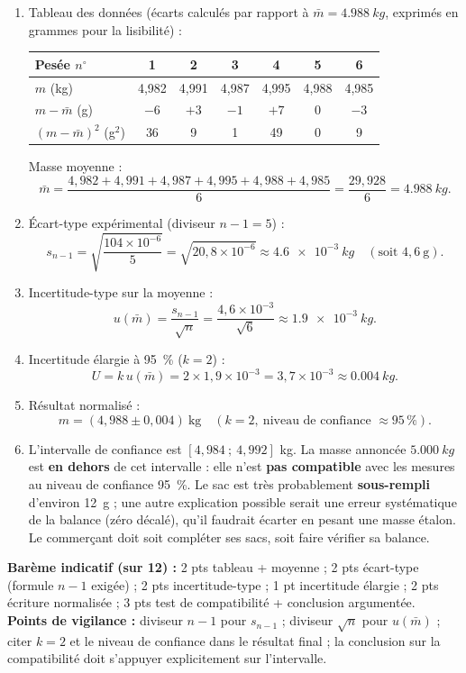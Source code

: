 \documentclass[11pt]{article}
\begin{document}
\begin{corrige}
\begin{enumerate}
\item Tableau des données (écarts calculés par rapport à $\bar{m} = \SI{4,988}{kg}$, exprimés en grammes pour la lisibilité) :
\begin{center}
\begin{tabular}{|l|*{6}{c|}}
\hline
Pesée $n^{\circ}$ & 1 & 2 & 3 & 4 & 5 & 6 \\
\hline
$m$ (kg) & 4,982 & 4,991 & 4,987 & 4,995 & 4,988 & 4,985 \\
\hline
$m - \bar{m}$ (g) & $-6$ & $+3$ & $-1$ & $+7$ & $0$ & $-3$ \\
\hline
$(m-\bar{m})^2$ (g$^2$) & 36 & 9 & 1 & 49 & 0 & 9 \\
\hline
\end{tabular}
\end{center}
Masse moyenne :
\[ \bar{m} = \frac{4{,}982 + 4{,}991 + 4{,}987 + 4{,}995 + 4{,}988 + 4{,}985}{6} = \frac{29{,}928}{6} = \SI{4,988}{kg}. \]
\item Écart-type expérimental (diviseur $n - 1 = 5$) :
\[ s_{n-1} = \sqrt{\frac{104 \times 10^{-6}}{5}} = \sqrt{20{,}8 \times 10^{-6}} \approx \SI{4,6e-3}{kg} \quad (\text{soit } 4{,}6~\text{g}). \]
\item Incertitude-type sur la moyenne :
\[ u(\bar{m}) = \frac{s_{n-1}}{\sqrt{n}} = \frac{4{,}6 \times 10^{-3}}{\sqrt{6}} \approx \SI{1,9e-3}{kg}. \]
\item Incertitude élargie à \SI{95}{\%} ($k = 2$) :
\[ U = k\,u(\bar{m}) = 2 \times 1{,}9 \times 10^{-3} = 3{,}7 \times 10^{-3} \approx \SI{0,004}{kg}. \]
\item Résultat normalisé :
\[ \boxed{m = (4{,}988 \pm 0{,}004)~\text{kg} \quad (k = 2,\ \text{niveau de confiance } \approx 95\,\%)}. \]
\item L'intervalle de confiance est $[4{,}984 \ ;\ 4{,}992]$ kg. La masse annoncée $\SI{5,000}{kg}$ est \textbf{en dehors} de cet intervalle : elle n'est \textbf{pas compatible} avec les mesures au niveau de confiance \SI{95}{\%}. Le sac est très probablement \textbf{sous-rempli} d'environ \SI{12}{g} ; une autre explication possible serait une erreur systématique de la balance (zéro décalé), qu'il faudrait écarter en pesant une masse étalon. Le commerçant doit soit compléter ses sacs, soit faire vérifier sa balance.
\end{enumerate}
\textbf{Barème indicatif (sur 12) :} 2 pts tableau + moyenne ; 2 pts écart-type (formule $n-1$ exigée) ; 2 pts incertitude-type ; 1 pt incertitude élargie ; 2 pts écriture normalisée ; 3 pts test de compatibilité + conclusion argumentée.\\
\textbf{Points de vigilance :} diviseur $n-1$ pour $s_{n-1}$ ; diviseur $\sqrt{n}$ pour $u(\bar{m})$ ; citer $k = 2$ et le niveau de confiance dans le résultat final ; la conclusion sur la compatibilité doit s'appuyer explicitement sur l'intervalle.
\end{corrige}
\end{document}
